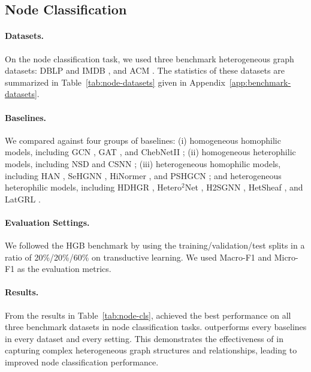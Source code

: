 \subsection{Node Classification}
\label{sec:setup-node}


\paragraph{Datasets.}
On the node classification task, we used three benchmark heterogeneous graph datasets: DBLP \cite{lv2021hgb} and IMDB \cite{lv2021hgb}, and ACM \cite{wang2019han}. The statistics of these datasets are summarized in Table~\ref{tab:node-datasets} given in
Appendix~\ref{app:benchmark-datasets}.


\paragraph{Baselines.} We compared \method{} against four groups of baselines: (i) homogeneous homophilic models, including GCN
\cite{kipf2017gcn}, GAT \cite{velickovic2018gat}, and ChebNetII \cite{he2022chebnetii}; (ii) homogeneous heterophilic models, including NSD
\cite{bodnar2022neural} and CSNN \cite{ribeiro2026cooperative}; (iii)
heterogeneous homophilic models, including HAN \cite{wang2019han}, SeHGNN \cite{yang2023sehgnn},
HiNormer \cite{mao2023hinormer}, and PSHGCN \cite{he2024spectral}; and heterogeneous heterophilic models, including HDHGR \cite{guo2023homophily}, Hetero$^2$Net \cite{li2025hetero2net}, H2SGNN
\cite{lu2026addressing}, HetSheaf \cite{braithwaite2024heterogeneous}, and LatGRL
\cite{shen2025heterophily}.


\paragraph{Evaluation Settings.} We followed the HGB benchmark \cite{lv2021hgb} by using the training/validation/test splits in a ratio of 20\%/20\%/60\% on transductive learning. We used Macro-F1 and Micro-F1 as the evaluation metrics.

\paragraph{Results.}
From the results in Table~\ref{tab:node-cls}, \method{} achieved the best performance on all three benchmark datasets in node classification tasks. \method{} outperforms every baselines in every dataset and every setting. This demonstrates the effectiveness of \method{} in capturing complex heterogeneous graph structures and relationships, leading to improved node classification performance.

